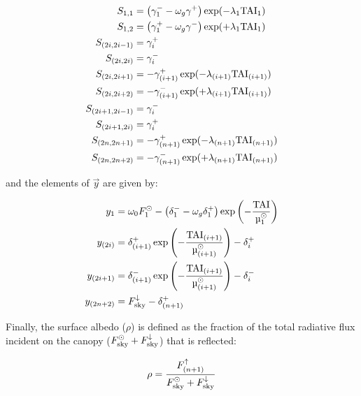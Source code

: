 \begin{align}
  \begin{split}
    S_{1,1}       &= \left( \gamma^{-}_{1} - \omega_{g} \gamma^{+} \right) \exp(-\lambda_{1} \mathrm{TAI}_{1}) \\
    S_{1,2}       &= \left( \gamma^{+}_{1} - \omega_{g} \gamma^{-} \right) \exp(+\lambda_{1} \mathrm{TAI}_{1}) \\
    S_{(2i, 2i-1)} &= \gamma^{+}_{i} \\
    S_{(2i, 2i)}  &= \gamma^{-}_{i} \\
    S_{(2i, 2i+1)} &= - \gamma^{+}_{(i+1)} \exp(-\lambda_{(i+1)} \mathrm{TAI}_{(i+1)}) \\
    S_{(2i, 2i+2)} &= - \gamma^{-}_{(i+1)} \exp(+\lambda_{(i+1)} \mathrm{TAI}_{(i+1)}) \\
    S_{(2i+1, 2i-1)}  &= \gamma^{-}_{i} \\
    S_{(2i+1, 2i)}    &= \gamma^{+}_{i} \\
    S_{(2n, 2n+1)} &= - \gamma^{+}_{(n+1)} \exp(-\lambda_{(n+1)} \mathrm{TAI}_{(n+1)}) \\
    S_{(2n, 2n+2)} &= - \gamma^{-}_{(n+1)} \exp(+\lambda_{(n+1)} \mathrm{TAI}_{(n+1)}) \\
  \end{split}
\end{align}

and the elements of $\vec{y}$ are given by:
  
\begin{align}
  \begin{split}
    y_{1}         &= \omega_{0} F^{\odot}_{1} - \left(\delta^{-}_{1} - \omega_{g} \delta^{+}_{1}\right) \exp\left( - \frac{\TAI}{\mu^{\odot}_{1}} \right) \\
    y_{(2i)}      &= \delta^{+}_{(i+1)} \exp\left(- \frac{\TAI_{(i+1)}}{\mu^{\odot}_{(i+1)}} \right) - \delta^{+}_{i} \\
    y_{(2i+1)}    &= \delta^{-}_{(i+1)} \exp\left(- \frac{\TAI_{(i+1)}}{\mu^{\odot}_{(i+1)}} \right) - \delta^{-}_{i} \\
    y_{(2n+2)}    &= F^{\down}_{\sky} - \delta^{+}_{(n+1)} \\
  \end{split}
\end{align}

Finally, the surface albedo ($\rho$) is defined as the fraction of the total radiative flux incident on the canopy ($F^{\odot}_{\mathrm{sky}} + F^{\downarrow}_{\mathrm{sky}}$) that is reflected:

\begin{equation}
  \rho = \frac{F^{\uparrow}_{(n+1)}}{F^{\odot}_{\mathrm{sky}} + F^{\downarrow}_{\mathrm{sky}}}
\end{equation}

